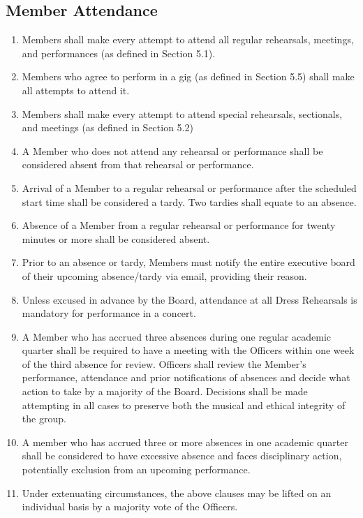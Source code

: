 \documentclass{article}
\begin{document}
\subsection{Member Attendance} \label{attendance}
\begin{enumerate}
\item Members shall make every attempt to attend all regular rehearsals,
  meetings, and performances (as defined in Section 5.1).
\item Members who agree to perform in a gig (as defined in Section 5.5) shall
  make all attempts to attend it.
\item Members shall make every attempt to attend special rehearsals, sectionals,
  and meetings (as defined in Section 5.2)
\item A Member who does not attend any rehearsal or performance shall be
  considered absent from that rehearsal or performance.
\item Arrival of a Member to a regular rehearsal or performance after the
  scheduled start time shall be considered a tardy. Two tardies shall equate to
  an absence.
\item Absence of a Member from a regular rehearsal or performance for twenty
  minutes or more shall be considered absent.
\item Prior to an absence or tardy, Members must notify the entire executive
  board of their upcoming absence/tardy via email, providing their reason.
\item Unless excused in advance by the Board, attendance at all Dress Rehearsals
  is mandatory for performance in a concert.
\item A Member who has accrued three absences during one regular academic
  quarter shall be required to have a meeting with the Officers within one week
  of the third absence for review. Officers shall review the Member's
  performance, attendance and prior notifications of absences and decide what
  action to take by a majority of the Board. Decisions shall be made attempting
  in all cases to preserve both the musical and ethical integrity of the group.
\item A member who has accrued three or more absences in one academic quarter
  shall be considered to have excessive absence and faces disciplinary action,
  potentially exclusion from an upcoming performance.
\item Under extenuating circumstances, the above clauses may be lifted on
  an individual basis by a majority vote of the Officers.
\end{enumerate}
\end{document}
